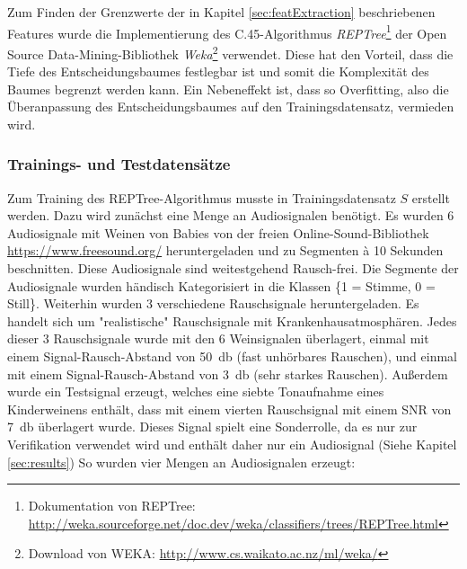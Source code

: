 Zum Finden der Grenzwerte der in Kapitel \ref{sec:featExtraction} beschriebenen Features wurde die Implementierung des C.45-Algorithmus \emph{REPTree}\footnote{Dokumentation von REPTree: \url{http://weka.sourceforge.net/doc.dev/weka/classifiers/trees/REPTree.html}} der Open Source Data-Mining-Bibliothek \emph{Weka}\footnote{Download von WEKA: \url{http://www.cs.waikato.ac.nz/ml/weka/}} verwendet. Diese hat den Vorteil, dass die Tiefe des Entscheidungsbaumes festlegbar ist und somit die Komplexität des Baumes begrenzt werden kann. Ein Nebeneffekt ist, dass so Overfitting, also die Überanpassung des Entscheidungsbaumes auf den Trainingsdatensatz, vermieden wird.

\subsubsection{Trainings- und Testdatensätze}
\label{sec:databases}

Zum Training des REPTree-Algorithmus musste in Trainingsdatensatz $S$ erstellt werden. Dazu wird zunächst eine Menge an Audiosignalen benötigt. Es wurden 6 Audiosignale mit Weinen von Babies von der freien Online-Sound-Bibliothek \url{https://www.freesound.org/} heruntergeladen und zu Segmenten à 10 Sekunden beschnitten. Diese Audiosignale sind weitestgehend Rausch-frei. Die Segmente der Audiosignale wurden händisch Kategorisiert in die Klassen \{1 = Stimme, 0 =  Still\}. Weiterhin wurden 3 verschiedene Rauschsignale heruntergeladen. Es handelt sich um "realistische" Rauschsignale mit Krankenhausatmosphären. Jedes dieser 3 Rauschsignale wurde mit den 6 Weinsignalen überlagert, einmal mit einem Signal-Rausch-Abstand von \SI{50}{\decibel} (fast unhörbares Rauschen), und einmal mit einem Signal-Rausch-Abstand von \SI{3}{\decibel} (sehr starkes Rauschen). Außerdem wurde ein Testsignal erzeugt, welches eine siebte Tonaufnahme eines Kinderweinens enthält, dass mit einem vierten Rauschsignal mit einem SNR von \SI{7}{\decibel} überlagert wurde. Dieses Signal spielt eine Sonderrolle, da es nur zur Verifikation verwendet wird und enthält daher nur ein Audiosignal (Siehe Kapitel \ref{sec:results}) So wurden vier Mengen an Audiosignalen erzeugt:

